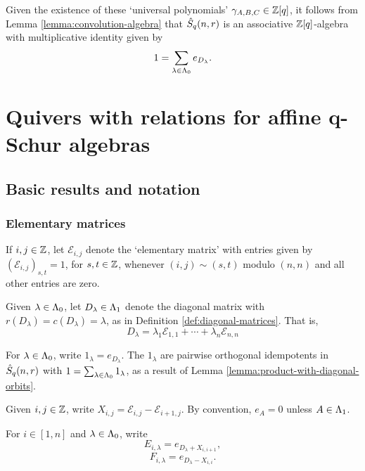 \documentclass[a4paper, 11pt]{report}
\begin{document}
Given the existence of these `universal polynomials' $\gamma_{A,B,C}\in\mathbb{Z}[q]$, it follows from Lemma \ref{lemma:convolution-algebra} that $\hat{S}_q(n,r)$ is an associative $\mathbb{Z}[q]$-algebra with multiplicative identity given by
\begin{equation*}
1 = \sum_{\lambda\in{\Lambda_0}} e_{D_\lambda}.
\end{equation*}

\chapter{Quivers with relations for affine q-Schur algebras}

\section{Basic results and notation}

\subsection{Elementary matrices}

If $i,j\in\mathbb{Z}$, let $\mathcal{E}_{i,j}$ denote the `elementary matrix' with entries given by $(\mathcal{E}_{i,j})_{s,t}=1$, for $s,t\in\mathbb{Z}$,  whenever $(i,j)\sim (s,t)$ modulo $(n,n)$ and all other entries are zero.

Given $\lambda\in{\Lambda_0}$, let $D_\lambda\in{\Lambda_1}$ denote the diagonal matrix with $r(D_\lambda)=c(D_\lambda) = \lambda$, as in Definition \ref{def:diagonal-matrices}. That is,
\begin{equation*}
D_\lambda = \lambda_1 \mathcal{E}_{1,1} +\cdots + \lambda_n \mathcal{E}_{n,n}
\end{equation*}

For $\lambda\in{\Lambda_0}$, write $1_\lambda = e_{D_\lambda}$. The $1_\lambda$ are pairwise orthogonal idempotents in $\hat{S}_q(n,r)$ with $1 = \sum_{\lambda\in{\Lambda_0}}1_\lambda$, as a result of Lemma \ref{lemma:product-with-diagonal-orbits}.

Given $i,j\in\mathbb{Z}$, write $X_{i,j} = \mathcal{E}_{i,j} - \mathcal{E}_{i+1,j}$. By convention, $e_A = 0$ unless $A\in{\Lambda_1}$.

For $i\in [1,n]$ and $\lambda\in{\Lambda_0}$, write
\begin{equation*}
E_{i,\lambda} = e_{D_\lambda + X_{i,i+1}},
\end{equation*}
\begin{equation*}
F_{i,\lambda} = e_{D_\lambda - X_{i,i}}.
\end{equation*}
\end{document}
